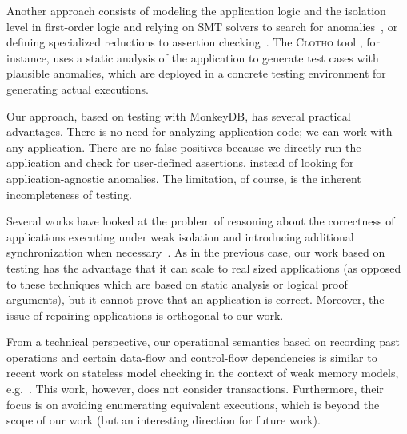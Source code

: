 Another approach consists of modeling the application
logic and the isolation level in first-order logic and relying on SMT solvers to
search for anomalies~\cite{DBLP:journals/pacmpl/KakiESJ18,DBLP:conf/concur/NagarJ18,burcu-netys},
or defining specialized reductions to assertion
checking~\cite{DBLP:conf/concur/BeillahiBE19,DBLP:conf/cav/BeillahiBE19}.
The \textsc{Clotho} tool \cite{DBLP:journals/pacmpl/RahmaniNDJ19}, for instance, uses a static analysis of the application to
generate test cases with plausible anomalies, which are deployed in a concrete
testing environment for generating actual executions. 

Our approach, based on testing with MonkeyDB, has several practical advantages.
There is no need for analyzing application code; we can work with any
application. There are no false positives because we directly run the
application and check for user-defined assertions, instead of looking for
application-agnostic anomalies. The limitation, of course, is
the inherent incompleteness of testing.

Several works have looked at the problem of reasoning about the correctness of
applications executing under weak isolation and introducing additional
synchronization when
necessary~\cite{DBLP:conf/eurosys/BalegasDFRPNS15,DBLP:conf/popl/GotsmanYFNS16,DBLP:conf/esop/NairP020,DBLP:conf/usenix/0001LCPRV14}.
As in the previous case, our work based on testing has the advantage that it can
scale to real sized applications (as opposed to these techniques which are based
on static analysis or logical proof arguments), but it cannot prove that an
application is correct. Moreover, the issue of repairing applications is
orthogonal to our work. 

From a technical perspective, our operational semantics based on recording past
operations and certain data-flow and control-flow dependencies is similar to
recent work on stateless model checking in the context of weak memory
models,
e.g.~\cite{DBLP:journals/pacmpl/Kokologiannakis18,DBLP:conf/tacas/AbdullaAAJLS15}.
This work, however, does not consider transactions. Furthermore, their focus is on
avoiding enumerating equivalent executions, which is beyond the scope of our
work (but an interesting direction for future work).

%

